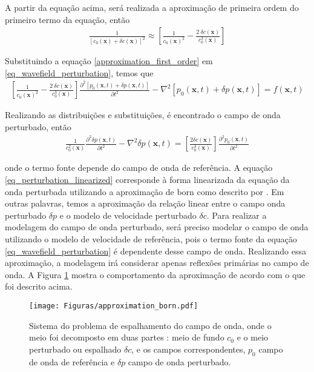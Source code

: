 A partir da equação acima, será realizada a aproximação de primeira ordem do primeiro termo da equação, então
\begin{eqnarray}
 \frac{1}{\left[c_{0}(\mathbf{x})+\delta c(\mathbf{x})\right]^{2}} \approx \left[ \frac{1}{c_{0}(\mathbf{x})^{2}} - \frac{2~\delta c(\mathbf{x})}{c_{0}^{3}(\mathbf{x})} \right ]
 \label{approximation_first_order}
\end{eqnarray}

Substituindo a equação \ref{approximation_first_order} em \ref{eq_wavefield_perturbation}, temos que
\begin{eqnarray}
 \left[ \frac{1}{c_{0}(\mathbf{x})^{2}} - \frac{2~\delta c(\mathbf{x})}{c_{0}^{3}(\mathbf{x})} \right ]
\frac{\partial^{2} \left[p_{0}(\mathbf{x},t) + \delta p(\mathbf{x},t) \right]}{\partial t^{2}} - \nabla^{2} \left[p_{0}(\mathbf{x},t)+ \delta p(\mathbf{x},t) \right] = f(\mathbf{x},t)
\end{eqnarray}

Realizando as distribuições e substituições, é encontrado o campo de onda perturbado, então
\begin{eqnarray}
 \frac{1}{c_{0}^{2}(\mathbf{x})} \frac{\partial^{2} \delta p(\mathbf{x},t)}{\partial t^{2}} - \nabla ^{2} \delta p(\mathbf{x},t) = \left [\frac{2\delta c(\mathbf{x})}{c_{0}^{3}(\mathbf{x})} \right ] \frac{\partial^{2} p_{0}(\mathbf{x},t)}{\partial t^{2}}
 \label{eq_perturbation_linearized}
\end{eqnarray}

onde o termo fonte depende do campo de onda de referência. A equação \ref{eq_perturbation_linearized} corresponde à forma linearizada da equação da onda perturbada utilizando a aproximação de born como descrito por \citet{keys_1983}. Em outras palavras, temos a aproximação da relação linear entre o campo onda perturbado $\delta p$ e o modelo de velocidade perturbado $\delta c$. Para realizar a modelagem do campo de onda perturbado, será preciso modelar o campo de onda utilizando o modelo de velocidade de referência, pois o termo fonte da equação \ref{eq_wavefield_perturbation}  é dependente desse campo de onda. Realizando essa aproximação, a modelagem irá considerar apenas reflexões primárias no campo de onda. A Figura \ref{approximation_born} mostra o comportamento da aproximação de acordo com o que foi descrito acima.
\begin{figure}[htb]
\centering
\texttt{[image: Figuras/approximation\_born.pdf]}
\caption{Sistema do problema de espalhamento do campo de onda, onde o meio foi decomposto em duas partes : meio de fundo $c_{0}$ e o meio perturbado ou espalhado  $\delta c$, e os campos correspondentes, $p_0$ campo de onda de referência e $\delta p$ campo de onda perturbado.}
\label{approximation_born}
\end{figure}







